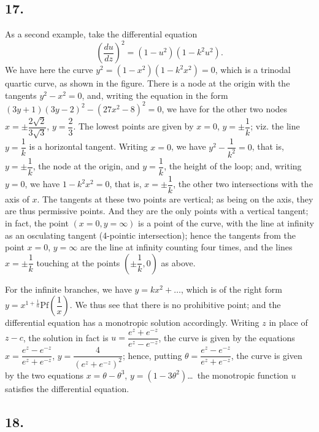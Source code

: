 \documentclass[11pt,a4paper]{book}
\providecommand{\Pf}{\mathrm{Pf}}
\begin{document}
\subsection*{17.}

As a second example, take the differential equation
\[
\left(\frac{du}{dz}\right)^2 = (1 - u^2)(1 - k^2 u^2).
\]
We have here the curve $y^2 = (1 - x^2)(1 - k^2 x^2) = 0$, which is a trinodal quartic curve, as shown in the figure. There is a node at the origin with the tangents $y^2 - x^2 = 0$, and, writing the equation in the form $(3y + 1)(3y - 2)^2 - (27x^2 - 8)^2 = 0$, we have for the other two nodes $x = \pm\dfrac{2\sqrt{2}}{3\sqrt{3}}$, $y = \dfrac{2}{3}$. The lowest points are given by $x = 0$, $y = \pm\dfrac{1}{k}$; viz. the line $y = \dfrac{1}{k}$ is a horizontal tangent. Writing $x = 0$, we have $y^2 - \dfrac{1}{k^2} = 0$, that is, $y = \pm\dfrac{1}{k}$, the node at the origin, and $y = \dfrac{1}{k}$, the height of the loop; and, writing $y = 0$, we have $1 - k^2 x^2 = 0$, that is, $x = \pm\dfrac{1}{k}$, the other two intersections with the axis of $x$. The tangents at these two points are vertical; as being on the axis, they are thus permissive points. And they are the only points with a vertical tangent; in fact, the point $(x = 0, y = \infty)$ is a point of the curve, with the line at infinity as an osculating tangent (4-pointic intersection); hence the tangents from the point $x = 0$, $y = \infty$ are the line at infinity counting four times, and the lines $x = \pm\dfrac{1}{k}$ touching at the points $\left(\pm\dfrac{1}{k}, 0\right)$ as above.

For the infinite branches, we have $y = kx^2 + \ldots$, which is of the right form $y = x^{1 + \frac{1}{n}} \Pf\left(\dfrac{1}{x}\right)$. We thus see that there is no prohibitive point; and the differential equation has a monotropic solution accordingly. Writing $z$ in place of $z - c$, the solution in fact is $u = \dfrac{e^z + e^{-z}}{e^z - e^{-z}}$, the curve is given by the equations $x = \dfrac{e^z - e^{-z}}{e^z + e^{-z}}$, $y = \dfrac{4}{(e^z + e^{-z})^2}$; hence, putting $\theta = \dfrac{e^z - e^{-z}}{e^z + e^{-z}}$, the curve is given by the two equations $x = \theta - \theta^3$, $y = (1 - 3\theta^2)$\ldots\ the monotropic function $u$ satisfies the differential equation.

\subsection*{18.}
\end{document}
